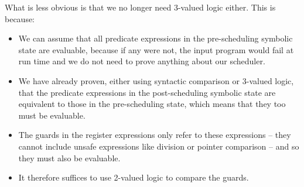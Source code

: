 {What is less obvious is that we no longer need 3-valued logic either. This is because:
\begin{itemize}
    \item We can assume that all predicate expressions in the pre-scheduling symbolic state are evaluable, because if any were not, the input program would fail at run time and we do not need to prove anything about our scheduler.
    \item We have already proven, either using syntactic comparison or 3-valued logic, that the predicate expressions in the post-scheduling symbolic state are equivalent to those in the pre-scheduling state, which means that they too must be evaluable.
    \item The guards in the register expressions only refer to these expressions -- they cannot include unsafe expressions like division or pointer comparison -- and so they must also be evaluable.
    \item It therefore suffices to use 2-valued logic to compare the guards.
\end{itemize}

}
